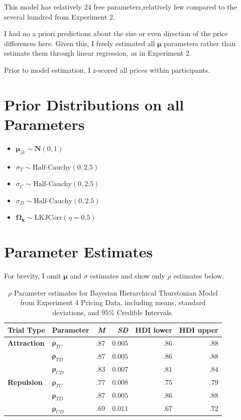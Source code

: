 This model has relatively $24$ free parameters,relatively few compared to the several hundred from Experiment 2.

I had no a priori predictions about the size or even direction of the price differences here. Given this, I freely estimated all $\boldsymbol{\mu}$ parameters rather than estimate them through linear regression, as in Experiment 2.

Prior to model estimation, I z-scored all prices within participants. 

\section{Prior Distributions on all Parameters}

\begin{itemize}
    \item $\boldsymbol{\mu}_{jk} \sim \mathcal{\textbf{N}}(0,1)$
    \item $\sigma_{T} \sim \text{Half-Cauchy}(0,2.5)$
    \item $\sigma_{C} \sim \text{Half-Cauchy}(0,2.5)$
    \item $\sigma_{D} \sim \text{Half-Cauchy}(0,2.5)$
    \item $\boldsymbol{\Omega_{k}} \sim \text{LKJCorr}(\eta=0.5)$
\end{itemize}

\section{Parameter Estimates}

For brevity, I omit $\boldsymbol{\mu}$ and $\sigma$ estimates and show only $\rho$ estimates below.
\begin{table}[ht]
    \centering
    \begin{tabular}{llrrrr}
        \toprule
        Trial Type & Parameter & \textit{M} & \textit{SD} & HDI lower & HDI upper \\
        \midrule
        \textbf{Attraction}  &  $\boldsymbol{\rho}_{TC}$     &    $.87$   &   $0.005$    &  $.86$     & $.88$     \\
                             &  $\boldsymbol{\rho}_{TD}$    &     $.87$   &   $0.005$    &  $.86$     & $.88$     \\
                             &  $\boldsymbol{\rho}_{CD}$    &     $.83$   &   $0.007$    &  $.81$     & $.84$     \\
        \textbf{Repulsion}   &  $\boldsymbol{\rho}_{TC}$     &    $.77$   &   $0.008$    &  $.75$     & $.79$     \\
                             &  $\boldsymbol{\rho}_{TD}$    &     $.87$   &   $0.005$    &  $.86$     & $.88$     \\
                             &  $\boldsymbol{\rho}_{CD}$    &     $.69$   &   $0.011$     &  $.67$     & $.72$     \\
        \bottomrule
    \end{tabular}
    \caption{$\rho$ Parameter estimates for Bayesian Hierarchical Thurstonian Model from Experiment 4 Pricing Data, including means, standard deviations, and $95\%$ Credible Intervals.}
    \label{tab:e4_rho_params}
\end{table}

